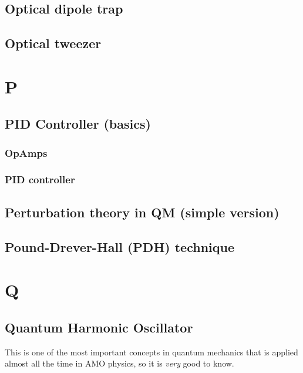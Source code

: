 \documentclass{book}
\theoremstyle{definition}
\begin{document}
\section*{Optical dipole trap}


\section*{Optical tweezer}


\chapter*{P}



\section*{PID Controller (basics)}


\subsection*{OpAmps}


\subsection*{PID controller}




\section*{Perturbation theory in QM (simple version)}





\section*{Pound-Drever-Hall (PDH) technique}
\chapter*{Q}

\section*{Quantum Harmonic Oscillator}

This is one of the most important concepts in quantum mechanics that is applied almost all the time in AMO physics, so it is \textit{very} good to know. \\
\end{document}
